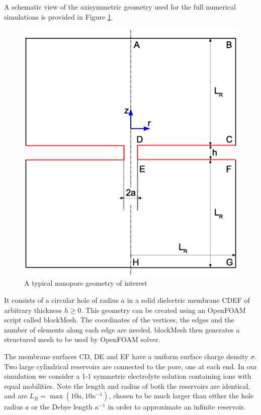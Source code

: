 A schematic view of the axisymmetric geometry used for the full numerical simulations is provided in Figure \ref{fig:system_num}. 
\begin{figure}[ht]
\centering
\includegraphics[width=1.0\textwidth]{openfoam/figure4.eps}
\caption{A typical nanopore geometry of interest}
\label{fig:system_num}
\end{figure}
It consists of a circular hole of radius $a$ in a solid dielectric membrane CDEF of arbitrary thickness $h\ge 0$. This geometry can be created using an OpenFOAM script called \textsf{blockMesh}. The coordinates of the vertices, the edges and the number of elements along each edge are needed. \textsf{blockMesh} then generates a structured mesh to be used by OpenFOAM solver.

The membrane surfaces CD, DE and EF have a uniform surface charge density $\sigma$. Two large cylindrical reservoirs are connected to the pore, one at each end. In our simulation we consider a 1-1 symmetric electrolyte solution containing ions with equal mobilities. Note the length and radius of both the reservoirs are identical, and are $L_R=\max(10a, 10\kappa^{-1})$, chosen to be much larger than either the hole radius $a$ or the Debye length $\kappa^{-1}$  in order to approximate an infinite reservoir. 

